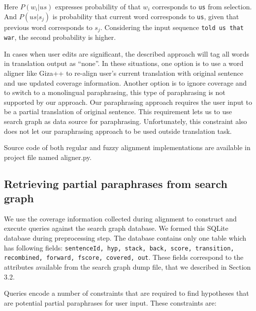 Here $P(w_{i}|us)$ expresses probability of that $w_{i}$ corresponds to \texttt{us} from selection. And $P(us|s_{j})$ is probability that current word corresponds to \texttt{us}, given that previous word corresponds to $s_{j}$. Considering the input sequence \texttt{told us that war}, the second probability is higher.

In cases when user edits are significant, the described approach will tag all words in translation output as ``none''. In these situations, one option is to use a word aligner like Giza++ to re-align user's current translation with original sentence and use updated coverage information. Another option is to ignore coverage and to switch to a monolingual paraphrasing, this type of paraphrasing is not supported by our approach. Our paraphrasing approach requires the user input to be a partial translation of original sentence. This requirement lets us to use search graph as data source for paraphrasing. Unfortunately, this constraint also does not let our paraphrasing approach to be used outside translation task.

Source code of both regular and fuzzy alignment implementations are available in project file named \textsf{aligner.py}. 

\subsection{Retrieving partial paraphrases from search graph}

We use the coverage information collected during alignment to construct and execute queries against the search graph database. We formed this SQLite database during preprocessing step. The database contains only one table which has following fields: \texttt{sentenceId, hyp, stack, back, score, transition, recombined, forward, fscore, covered, out}. These fields correspond to the attributes available from the search graph dump file, that we described in Section 3.2. 

Queries encode a number of constraints that are required to find hypotheses that are potential partial paraphrases for user input. These constraints are:

